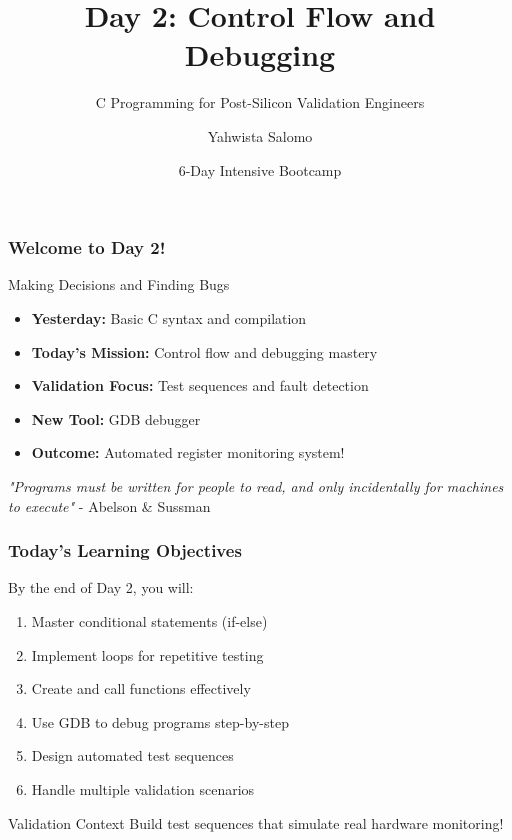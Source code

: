 \documentclass{beamer}
\title{Day 2: Control Flow and Debugging}
\subtitle{C Programming for Post-Silicon Validation Engineers}
\author{Yahwista Salomo}
\date{6-Day Intensive Bootcamp}
\institute{Post-Silicon Validation Training Program}
\begin{document}
\frame{\titlepage}

\begin{frame}
\frametitle{Welcome to Day 2!}
\begin{center}
\Large Making Decisions and Finding Bugs
\end{center}

\begin{itemize}
    \item \textbf{Yesterday:} Basic C syntax and compilation
    \item \textbf{Today's Mission:} Control flow and debugging mastery
    \item \textbf{Validation Focus:} Test sequences and fault detection
    \item \textbf{New Tool:} GDB debugger
    \item \textbf{Outcome:} Automated register monitoring system!
\end{itemize}

\vspace{0.5cm}
\begin{center}
\textit{"Programs must be written for people to read, and only incidentally for machines to execute"} - Abelson \& Sussman
\end{center}
\end{frame}

\begin{frame}
\frametitle{Today's Learning Objectives}
By the end of Day 2, you will:

\begin{enumerate}
    \item Master conditional statements (if-else)
    \item Implement loops for repetitive testing
    \item Create and call functions effectively
    \item Use GDB to debug programs step-by-step
    \item Design automated test sequences
    \item Handle multiple validation scenarios
\end{enumerate}

\vspace{0.5cm}
\begin{alertblock}{Validation Context}
Build test sequences that simulate real hardware monitoring!
\end{alertblock}
\end{frame}
\end{document}
